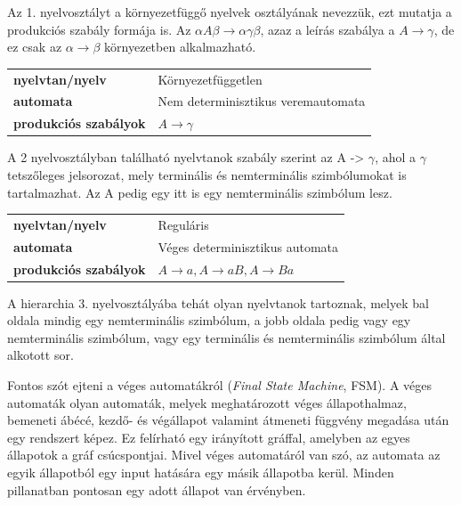 \medskip

Az 1. nyelvosztályt a környezetfüggő nyelvek osztályának nevezzük, ezt mutatja a produkciós szabály formája is.
Az $\alpha A \beta \rightarrow \alpha \gamma \beta$, azaz a leírás szabálya a $A \rightarrow \gamma$, de ez csak az $\alpha \rightarrow \beta$ környezetben alkalmazható.


\begin{tabular}{ll}
\textbf{nyelvtan/nyelv} & Környezetfüggetlen \\
\textbf{automata} & Nem determinisztikus veremautomata \\
\textbf{produkciós szabályok} & $A \rightarrow \gamma$ \\
\end{tabular}

\medskip

A 2 nyelvosztályban található nyelvtanok szabály szerint az A -> $\gamma$, ahol a $\gamma$ tetszőleges jelsorozat, mely terminális és nemterminális szimbólumokat is tartalmazhat. Az A pedig egy itt is egy nemterminális szimbólum lesz.


\begin{tabular}{ll}
\textbf{nyelvtan/nyelv} & Reguláris \\
\textbf{automata} & Véges determinisztikus automata \\
\textbf{produkciós szabályok} & $A \rightarrow a, A \rightarrow aB, A \rightarrow Ba$ \\
\end{tabular}

\medskip

A hierarchia 3. nyelvosztályába tehát olyan nyelvtanok tartoznak, melyek bal oldala mindig egy nemterminális szimbólum, a jobb oldala pedig vagy egy nemterminális szimbólum, vagy egy terminális és nemterminális szimbólum által alkotott sor.


Fontos szót ejteni a véges automatákról (\textit{Final State Machine}, FSM). A véges automaták olyan automaták, melyek meghatározott véges állapothalmaz, bemeneti ábécé, kezdő- és végállapot valamint átmeneti függvény megadása után egy rendszert képez. Ez felírható egy irányított gráffal, amelyben az egyes állapotok a gráf csúcspontjai. Mivel véges automatáról van szó, az automata az egyik állapotból egy input hatására egy másik állapotba kerül. Minden pillanatban pontosan egy adott állapot van érvényben.


